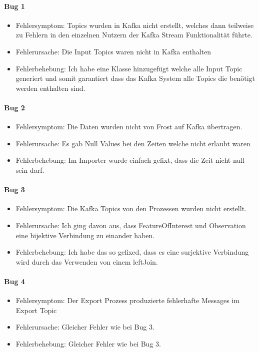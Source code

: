 \paragraph{Bug 1}
\begin{itemize}
	\item Fehlersymptom: Topics wurden in Kafka nicht erstellt, welches dann teilweise zu Fehlern in den einzelnen Nutzern der Kafka Stream Funktionalität führte.
	\item Fehlerursache: Die Input Topics waren nicht in Kafka enthalten
	\item Fehlerbehebung: Ich habe eine Klasse hinzugefügt welche alle Input Topic generiert und somit garantiert dass das Kafka System alle Topics die benötigt werden enthalten sind. 
\end{itemize}

\paragraph{Bug 2}
\begin{itemize}
	\item Fehlersymptom: Die Daten wurden nicht von Frost auf Kafka übertragen.
	\item Fehlerursache: Es gab Null Values bei den Zeiten welche nicht erlaubt waren
	\item Fehlerbehebung: Im Importer wurde einfach gefixt, dass die Zeit nicht null sein darf.
\end{itemize}

\paragraph{Bug 3}
\begin{itemize}
	\item Fehlersymptom: Die Kafka Topics von den Prozessen wurden nicht erstellt.
	\item Fehlerursache: Ich ging davon aus, dass FeatureOfInterest und Observation eine bijektive Verbindung zu einander haben.
	\item Fehlerbehebung: Ich habe das so gefixed, dass es eine surjektive Verbindung wird durch das Verwenden von einem leftJoin.
\end{itemize}

\paragraph{Bug 4}
\begin{itemize}
	\item Fehlersymptom: Der Export Prozess produzierte fehlerhafte Messages im Export Topic
	\item Fehlerursache: Gleicher Fehler wie bei Bug 3.
	\item Fehlerbehebung: Gleicher Fehler wie bei Bug 3.
\end{itemize}
\newpage
